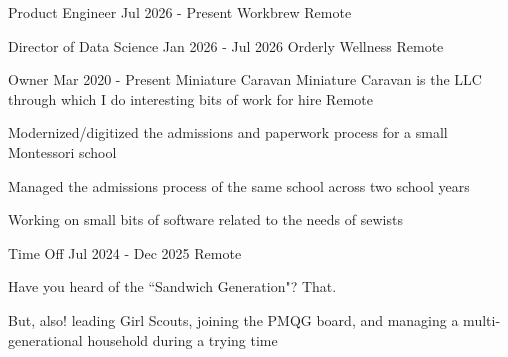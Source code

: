 

\begin{cventries}

  \cventry
  {Product Engineer}
  {Jul 2026 - Present}
  {Workbrew}
  {Remote}
  {
  }

  \cventry
  {Director of Data Science}
  {Jan 2026 - Jul 2026}
  {Orderly Wellness}
  {Remote}
  {
  }

  \cventrywithorganizationnote
  {Owner}
  {Mar 2020 - Present}
  {Miniature Caravan}
  {Miniature Caravan is the LLC through which I do interesting bits of work for hire}
  {Remote}
  {
    \begin{cvitems}
    \item Modernized/digitized the admissions and paperwork process for a small Montessori school
    \item Managed the admissions process of the same school across two school years
    \item Working on small bits of software related to the needs of sewists
    \end{cvitems}
    \cvtags{
      \tagRuby
      \tagRails
      \tagHAML
      \tagSASS
      \tagAirtable
      \tagPostgreSQL
      \tagTDDShort
      \tagCustomerService
      \tagProjectManagement
    }
  }

  \cventrywithorganizationnote
  {Time Off}
  {Jul 2024 - Dec 2025}
  {}
  {} %
  {Remote}
  {
    \begin{cvitems}
      \item Have you heard of the ``Sandwich Generation"? That.
      \item But, also! leading Girl Scouts, joining the PMQG board, and managing a multi-generational household during a trying time
    \end{cvitems}
    \cvtags{
      \tagAirtable
      \tagProjectManagement
      \tagTeaching
    }
  }


\end{cventries}
